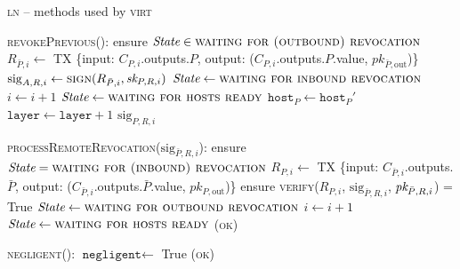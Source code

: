 \begin{center}
  \begin{processbox}{\textsc{ln} -- methods used by \textsc{virt}}
    \begin{algorithmic}[1]
      \State \textsc{revokePrevious}():
      \label{code:ln:methods-for-virt:revoke-previous}
      \Indent
        \State ensure $\itistate \in \textsc{waiting for (outbound)
        revocation}$
        \State $R_{\bar{P}, i} \gets$ TX \{input: $C_{P, i}$.outputs.$P$,
        output: ($C_{P, i}$.outputs.$P$.value, $pk_{\bar{P}, \mathrm{out}}$)\}
        \State $\mathrm{sig}_{A, R, i} \gets \textsc{sign}(R_{\bar{P}, i},
        \textit{sk}_{P, R, i})$
          \State $\itistate \gets \textsc{waiting for inbound revocation}$
        \Else \: 
          \State $i \gets i + 1$
          \State $\itistate \gets \textsc{waiting for hosts ready}$
        \EndIf
        \State $\texttt{host}_P \gets \texttt{host}_P'$ 
        \State $\texttt{layer} \gets \texttt{layer} + 1$
        \label{code:ln:methods-for-virt:host-update}
        \State \Return $\mathrm{sig}_{P, R, i}$
      \EndIndent
      \Statex

      \State \textsc{processRemoteRevocation}($\mathrm{sig}_{\bar{P}, R, i}$):
      \label{code:ln:methods-for-virt:process-remote-revocation}
      \Indent
        \State ensure $\itistate = \textsc{waiting for (inbound)
        revocation}$
        \State $R_{P, i} \gets$ TX \{input: $C_{\bar{P}, i}$.outputs.$\bar{P}$,
        output: ($C_{\bar{P}, i}$.outputs.$\bar{P}$.value, $pk_{P,
        \mathrm{out}}$)\}
        \State ensure \textsc{verify}($R_{P, i}$, $\mathrm{sig}_{\bar{P}, R,
        i}$, $\textit{pk}_{\bar{P}, R, i}$) = True
          \State $\itistate \gets \textsc{waiting for outbound
          revocation}$
        \Else \: 
          \State $i \gets i + 1$
          \State $\itistate \gets \textsc{waiting for hosts ready}$
        \EndIf
        \State \Return (\textsc{ok})
      \EndIndent
      \Statex

      \State \textsc{negligent}():
      \Indent
        \State $\texttt{negligent} \gets$ True
        \label{code:ln:methods-for-virt:negligent}
        \State \Return (\textsc{ok})
      \EndIndent
    \end{algorithmic}
  \end{processbox}
  \label{code:ln:methods-for-virt}
\end{center} \ \\

